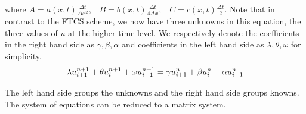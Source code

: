 \documentclass[12pt, oneside]{book}
\theoremstyle{plain}
\theoremstyle{definition}
\begin{document}
where $ A = a(x, t) \frac{\Delta t}{\Delta x^2}, \hspace{10pt}  B = b(x, t) \frac{\Delta t}{4\Delta x}, \hspace{10pt} C = c(x, t) \frac{\Delta t}{2}$. Note that in contrast to the FTCS scheme, we now have three unknowns in this equation, the three values of $u$ at the higher time level.  We respectively denote the coefficients in the right hand side as $\gamma, \beta, \alpha$ and coefficients in the left hand side as $\lambda, \theta, \omega$ for simplicity.
\begin{equation}
\lambda u^{n+1}_{i+1} + \theta u^{n+1}_i + \omega u^{n+1}_{i-1} \\
=  \gamma u^{n}_{i+1} + \beta u^{n}_i + \alpha u^{n}_{i-1}
\end{equation}

The left hand side groups the unknowns and the right hand side groups knowns. The system of equations can be  reduced to a matrix system.
\end{document}
